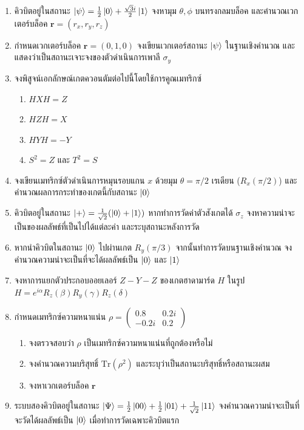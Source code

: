 \begin{enumerate}[label=\textbf{\arabic*.}]
    \item คิวบิตอยู่ในสถานะ $\ket{\psi} = \frac{1}{2}\ket{0} + \frac{\sqrt{3}i}{2}\ket{1}$ จงหามุม $\theta, \phi$ บนทรงกลมบล็อค และคำนวณเวกเตอร์บล็อค $\mathbf{r} = (r_x, r_y, r_z)$
    \item กำหนดเวกเตอร์บล็อค $\mathbf{r} = (0, 1, 0)$ จงเขียนเวกเตอร์สถานะ $\ket{\psi}$ ในฐานเชิงคำนวณ และแสดงว่าเป็นสถานะเจาะจงของตัวดำเนินการเพาลี $\sigma_y$
    \item จงพิสูจน์เอกลักษณ์เกตควอนตัมต่อไปนี้โดยใช้การคูณเมทริกซ์
    \begin{enumerate}
        \item $H X H = Z$
        \item $H Z H = X$
        \item $H Y H = -Y$
        \item $S^2 = Z$ และ $T^2 = S$
    \end{enumerate}
    \item จงเขียนเมทริกซ์ตัวดำเนินการหมุนรอบแกน $x$ ด้วยมุม $\theta = \pi/2$ เรเดียน ($R_x(\pi/2)$) และคำนวณผลการกระทำของเกตนี้กับสถานะ $\ket{0}$
    \item คิวบิตอยู่ในสถานะ $\ket{+} = \frac{1}{\sqrt{2}}(\ket{0}+\ket{1})$ หากทำการวัดค่าตัวสังเกตได้ $\sigma_z$ จงหาความน่าจะเป็นของผลลัพธ์ที่เป็นไปได้แต่ละค่า และระบุสถานะหลังการวัด
    \item หากนำคิวบิตในสถานะ $\ket{0}$ ไปผ่านเกต $R_y(\pi/3)$ จากนั้นทำการวัดบนฐานเชิงคำนวณ จงคำนวณความน่าจะเป็นที่จะได้ผลลัพธ์เป็น $\ket{0}$ และ $\ket{1}$
    \item จงหาการแยกตัวประกอบออยเลอร์ $Z-Y-Z$ ของเกตฮาดามาร์ด $H$ ในรูป $H = e^{i\alpha} R_z(\beta) R_y(\gamma) R_z(\delta)$
    \item กำหนดเมทริกซ์ความหนาแน่น $\rho = \begin{pmatrix} 0.8 & 0.2i \\ -0.2i & 0.2 \end{pmatrix}$
    \begin{enumerate}
        \item จงตรวจสอบว่า $\rho$ เป็นเมทริกซ์ความหนาแน่นที่ถูกต้องหรือไม่
        \item จงคำนวณความบริสุทธิ์ $\text{Tr}(\rho^2)$ และระบุว่าเป็นสถานะบริสุทธิ์หรือสถานะผสม
        \item จงหาเวกเตอร์บล็อค $\mathbf{r}$
    \end{enumerate}
    \item ระบบสองคิวบิตอยู่ในสถานะ $\ket{\Psi} = \frac{1}{2}\ket{00} + \frac{1}{2}\ket{01} + \frac{1}{\sqrt{2}}\ket{11}$ จงคำนวณความน่าจะเป็นที่จะวัดได้ผลลัพธ์เป็น $\ket{0}$ เมื่อทำการวัดเฉพาะคิวบิตแรก

\end{enumerate}
